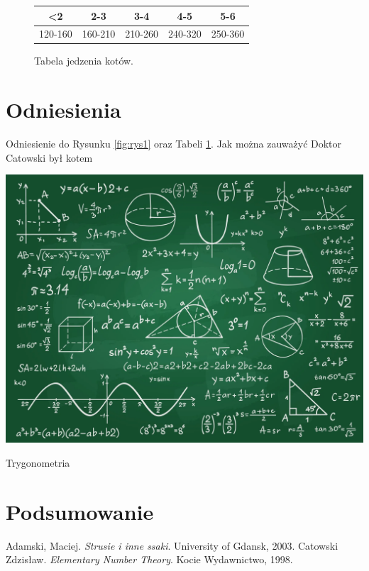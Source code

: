 \documentclass{article}
\begin{document}
\lipsum[1-2]

\begin{figure}[h]
    \centering
    \begin{tabular}{|c|c|c|c|c|}
        \hline
        <2 & 2-3 & 3-4 & 4-5 & 5-6 \\
        \hline
        120-160 & 160-210 & 210-260 & 240-320 & 250-360 \\
        \hline
    \end{tabular}
    \caption{Tabela jedzenia kotów.}
    \label{tab:tabela1}
\end{figure}

\section{Odniesienia}

Odniesienie do Rysunku \ref{fig:rys1} oraz Tabeli \ref{tab:tabela1}. Jak można zauważyć Doktor Catowski był kotem

\centering
    \begin{minipage}{0.4\textwidth}
        \includegraphics[width=\linewidth]{image1.png}
        \label{fig:rys2}
    \end{minipage}
    \hspace{0.05\textwidth}
    \begin{minipage}{0.5\textwidth}
        Trygonometria
    \end{minipage}

\section{Podsumowanie}

\lipsum[1-2]

\begin{thebibliography}{9}
     Adamski, Maciej. \emph{Strusie i inne ssaki}. University of Gdansk, 2003.
     Catowski Zdzisław. \emph{Elementary Number Theory}. Kocie Wydawnictwo, 1998.
\end{thebibliography}
\end{document}
